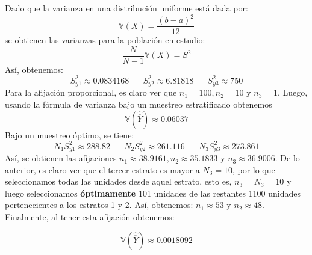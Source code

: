 \begin{solution}
Dado que la varianza en una distribución uniforme está dada por:
$$\mathbb{V}(X)=\dfrac{(b-a)^2}{12}$$
se obtienen las varianzas para la población en estudio:
$$\dfrac{N}{N-1}\mathbb{V}(X)=S^2$$
Así, obtenemos:
$$S_{y1}^{2}\approx 0.0834168 \hspace{20pt} S_{y2}^{2}\approx 6.81818 \hspace{20pt} S_{y3}^{2}\approx 750$$
Para la afijación proporcional, es claro ver que $n_1=100, n_2=10$ y $n_3=1$. Luego, usando la fórmula de varianza bajo un muestreo estratificado obtenemos $$\mathbb{V}(\hat{\overline{Y}})\approx 0.06037$$
Bajo un muestreo óptimo, se tiene:
$$N_1 S_{y1}^{2}\approx 288.82 \hspace{20pt} N_2 S_{y2}^{2}\approx 261.116 \hspace{20pt} N_3 S_{y3}^{2}\approx 273.861$$
Así, se obtienen las afijaciones $n_1\approx 38.9161 , n_2\approx 35.1833$ y $n_3\approx 36.9006$. De lo anterior, es claro ver que el tercer estrato es mayor a $N_3=10$, por lo que seleccionamos todas las unidades desde aquel estrato, esto es, $n_3=N_3=10$ y luego seleccionamos \textbf{óptimamente} 101 unidades de las restantes 1100 unidades pertenecientes a los estratos 1 y 2. Así, obtenemos: $n_1\approx 53$ y $n_2\approx 48$. Finalmente, al tener esta afijación obtenemos:

$$\mathbb{V}(\hat{\overline{Y}})\approx 0.0018092$$
\end{solution}